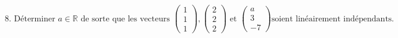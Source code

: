 \documentclass{article}
\begin{document}
\[
\text{8. Déterminer } a \in \mathbb{R} \text{ de sorte que les vecteurs } \begin{pmatrix} 1 \\ 1 \\ 1 \end{pmatrix}, \begin{pmatrix} 2 \\ 2 \\ 2 \end{pmatrix} \text{ et } \begin{pmatrix} a \\ 3 \\ -7 \end{pmatrix} \text{soient linéairement indépendants.}
\]
\end{document}
